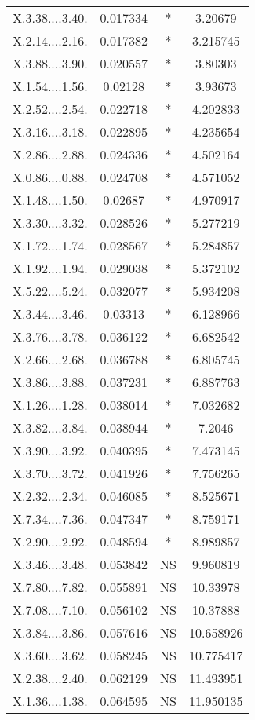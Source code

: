 \documentclass[]{article}
\begin{document}
\begin{longtable}{ c c c c }
X.3.38....3.40. & 0.017334 & * & 3.20679\\
X.2.14....2.16. & 0.017382 & * & 3.215745\\
X.3.88....3.90. & 0.020557 & * & 3.80303\\
X.1.54....1.56. & 0.02128 & * & 3.93673\\
X.2.52....2.54. & 0.022718 & * & 4.202833\\
X.3.16....3.18. & 0.022895 & * & 4.235654\\
X.2.86....2.88. & 0.024336 & * & 4.502164\\
X.0.86....0.88. & 0.024708 & * & 4.571052\\
X.1.48....1.50. & 0.02687 & * & 4.970917\\
X.3.30....3.32. & 0.028526 & * & 5.277219\\
X.1.72....1.74. & 0.028567 & * & 5.284857\\
X.1.92....1.94. & 0.029038 & * & 5.372102\\
X.5.22....5.24. & 0.032077 & * & 5.934208\\
X.3.44....3.46. & 0.03313 & * & 6.128966\\
X.3.76....3.78. & 0.036122 & * & 6.682542\\
X.2.66....2.68. & 0.036788 & * & 6.805745\\
X.3.86....3.88. & 0.037231 & * & 6.887763\\
X.1.26....1.28. & 0.038014 & * & 7.032682\\
X.3.82....3.84. & 0.038944 & * & 7.2046\\
X.3.90....3.92. & 0.040395 & * & 7.473145\\
X.3.70....3.72. & 0.041926 & * & 7.756265\\
X.2.32....2.34. & 0.046085 & * & 8.525671\\
X.7.34....7.36. & 0.047347 & * & 8.759171\\
X.2.90....2.92. & 0.048594 & * & 8.989857\\
X.3.46....3.48. & 0.053842 & NS & 9.960819\\
X.7.80....7.82. & 0.055891 & NS & 10.33978\\
X.7.08....7.10. & 0.056102 & NS & 10.37888\\
X.3.84....3.86. & 0.057616 & NS & 10.658926\\
X.3.60....3.62. & 0.058245 & NS & 10.775417\\
X.2.38....2.40. & 0.062129 & NS & 11.493951\\
X.1.36....1.38. & 0.064595 & NS & 11.950135\\

\end{longtable}
\end{document}
